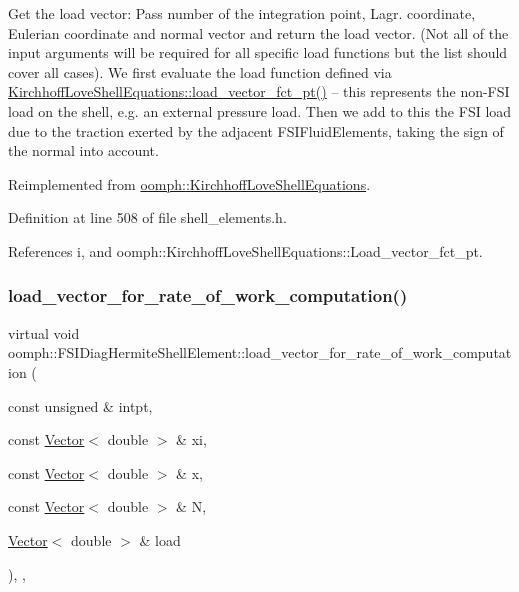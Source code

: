 Get the load vector\+: Pass number of the integration point, Lagr. coordinate, Eulerian coordinate and normal vector and return the load vector. (Not all of the input arguments will be required for all specific load functions but the list should cover all cases). We first evaluate the load function defined via \hyperlink{classoomph_1_1KirchhoffLoveShellEquations_a92a3f04077bfcfa5d0a7879003d93801}{Kirchhoff\+Love\+Shell\+Equations\+::load\+\_\+vector\+\_\+fct\+\_\+pt()} -- this represents the non-\/\+F\+SI load on the shell, e.\+g. an external pressure load. Then we add to this the F\+SI load due to the traction exerted by the adjacent F\+S\+I\+Fluid\+Elements, taking the sign of the normal into account. 



Reimplemented from \hyperlink{classoomph_1_1KirchhoffLoveShellEquations_ad404001c9a8c9587ece41bc4ff8c1ce1}{oomph\+::\+Kirchhoff\+Love\+Shell\+Equations}.



Definition at line 508 of file shell\+\_\+elements.\+h.



References i, and oomph\+::\+Kirchhoff\+Love\+Shell\+Equations\+::\+Load\+\_\+vector\+\_\+fct\+\_\+pt.

\mbox{\label{classoomph_1_1FSIDiagHermiteShellElement_ad57fbbe43b255ff6429c43366fb5d64a}} 
\subsubsection{\texorpdfstring{load\+\_\+vector\+\_\+for\+\_\+rate\+\_\+of\+\_\+work\+\_\+computation()}{load\_vector\_for\_rate\_of\_work\_computation()}}
{\footnotesize\ttfamily virtual void oomph\+::\+F\+S\+I\+Diag\+Hermite\+Shell\+Element\+::load\+\_\+vector\+\_\+for\+\_\+rate\+\_\+of\+\_\+work\+\_\+computation (\begin{DoxyParamCaption}\item[{const unsigned \&}]{intpt,  }\item[{const \hyperlink{classoomph_1_1Vector}{Vector}$<$ double $>$ \&}]{xi,  }\item[{const \hyperlink{classoomph_1_1Vector}{Vector}$<$ double $>$ \&}]{x,  }\item[{const \hyperlink{classoomph_1_1Vector}{Vector}$<$ double $>$ \&}]{N,  }\item[{\hyperlink{classoomph_1_1Vector}{Vector}$<$ double $>$ \&}]{load }\end{DoxyParamCaption})\hspace{0.3cm}{\ttfamily [inline]}, {\ttfamily [private]}, {\ttfamily [virtual]}}



